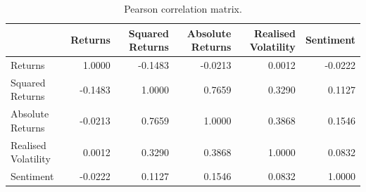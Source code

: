 \begin{table}[htbp]
\centering
\begin{tabular}{lrrrrr}
\toprule
 & Returns & Squared Returns & Absolute Returns & Realised Volatility & Sentiment \\
\midrule
Returns & 1.0000 & -0.1483 & -0.0213 & 0.0012 & -0.0222 \\
Squared Returns & -0.1483 & 1.0000 & 0.7659 & 0.3290 & 0.1127 \\
Absolute Returns & -0.0213 & 0.7659 & 1.0000 & 0.3868 & 0.1546 \\
Realised Volatility & 0.0012 & 0.3290 & 0.3868 & 1.0000 & 0.0832 \\
Sentiment & -0.0222 & 0.1127 & 0.1546 & 0.0832 & 1.0000 \\
\bottomrule
\end{tabular}
\caption{Pearson correlation matrix.}
\label{tab:correlation}
\end{table}
